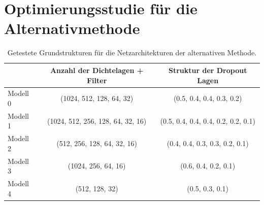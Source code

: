 \chapter{Optimierungsstudie für die Alternativmethode}

%
\begin{table}
  \centering%
  \begin{tabular}{l
                  c
                  c}
      \toprule
      {}    & Anzahl der Dichtelagen + Filter     & Struktur der Dropout Lagen      \\
      \midrule
      Modell 0    & (1024, 512, 128, 64, 32)  & (0.5, 0.4, 0.4, 0.3, 0.2) \\
      Modell 1    & (1024, 512, 256, 128, 64, 32, 16)  & (0.5, 0.4, 0.4, 0.4, 0.2, 0.2, 0.1) \\
      Modell 2    & (512, 256, 128, 64, 32, 16)  & (0.4, 0.4, 0.3, 0.3, 0.2, 0.1) \\
      Modell 3    & (1024, 256, 64, 16)  & (0.6, 0.4, 0.2, 0.1) \\
      Modell 4    & (512, 128, 32)  & (0.5, 0.3, 0.1) \\
      \bottomrule
  \end{tabular}
  \caption{Getestete Grundstrukturen für die Netzarchitekturen der alternativen Methode.}
  \label{tab:grid}
\end{table}
%
%
